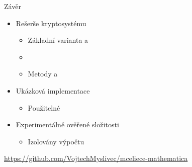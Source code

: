 \documentclass{beamer}
\begin{document}
\begin{frame}{Závěr}
    \begin{itemize}

        \item Rešerše kryptosystému
            \begin{itemize}
                \item Základní varianta a 
                \item {}
                \item Metody  a 
            \end{itemize}

        \item Ukázková implementace
            \begin{itemize}
                \item Použitelné 
            \end{itemize}

        \item Experimentálně ověřené složitosti
            \begin{itemize}
                \item Izolovány  výpočtu
            \end{itemize}

    \end{itemize}
\end{frame}


\begin{frame}
    \begin{center}

        {
            \Large
        }

        \vspace{1cm}

        {
            \small
            \url{https://github.com/VojtechMyslivec/mceliece-mathematica}
        }

    \end{center}
\end{frame}


\appendix
\end{document}
